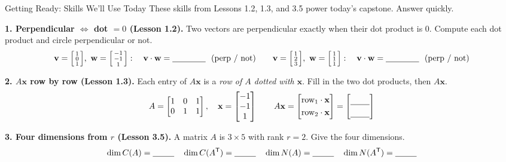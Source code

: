 \documentclass[10pt]{article}
\newcommand{\xx}{\mathbf{x}}
\newcommand{\vv}{\mathbf{v}}
\newcommand{\ww}{\mathbf{w}}
\newcommand{\T}{\mathsf{T}}
\begin{document}
\namedateperiod

\vspace{0.12in}

\begin{notesbox}{Getting Ready: Skills We'll Use Today}
\small These skills from Lessons 1.2, 1.3, and 3.5 power today's capstone. Answer quickly.

\vspace{4pt}
\textbf{1. Perpendicular $\Leftrightarrow$ dot $=0$ (Lesson 1.2).} Two vectors are perpendicular exactly when
their dot product is $0$. Compute each dot product and circle perpendicular or not.
\[
  \vv=\begin{bsmallmatrix} 1\\0\\1 \end{bsmallmatrix},\ \ww=\begin{bsmallmatrix} -1\\-1\\1 \end{bsmallmatrix}:
  \quad \vv\cdot\ww=\blank{1.4cm}\ \ \text{(perp / not)}
  \qquad
  \vv=\begin{bsmallmatrix} 1\\2\\3 \end{bsmallmatrix},\ \ww=\begin{bsmallmatrix} 1\\1\\1 \end{bsmallmatrix}:
  \quad \vv\cdot\ww=\blank{1.4cm}\ \ \text{(perp / not)}
\]

\vspace{4pt}
\textbf{2. $A\xx$ row by row (Lesson 1.3).} Each entry of $A\xx$ is a \emph{row of $A$ dotted with $\xx$}.
Fill in the two dot products, then $A\xx$.
\[
  A=\begin{bmatrix} 1 & 0 & 1 \\ 0 & 1 & 1 \end{bmatrix},\quad
  \xx=\begin{bmatrix} -1 \\ -1 \\ 1 \end{bmatrix}
  \qquad
  A\xx=\begin{bmatrix} \text{row}_1\cdot\xx \\[3pt] \text{row}_2\cdot\xx \end{bmatrix}
      =\begin{bmatrix}\rule{0pt}{1.1em}\blank{0.8cm}\\[3pt] \blank{0.8cm}\end{bmatrix}
\]

\vspace{4pt}
\textbf{3. Four dimensions from $r$ (Lesson 3.5).} A matrix $A$ is $3\times 5$ with rank $r=2$. Give the four
dimensions.
\[
  \dim C(A)=\blank{0.9cm}\quad \dim C(A^{\T})=\blank{0.9cm}\quad
  \dim N(A)=\blank{0.9cm}\quad \dim N(A^{\T})=\blank{0.9cm}
\]
\end{notesbox}
\end{document}
